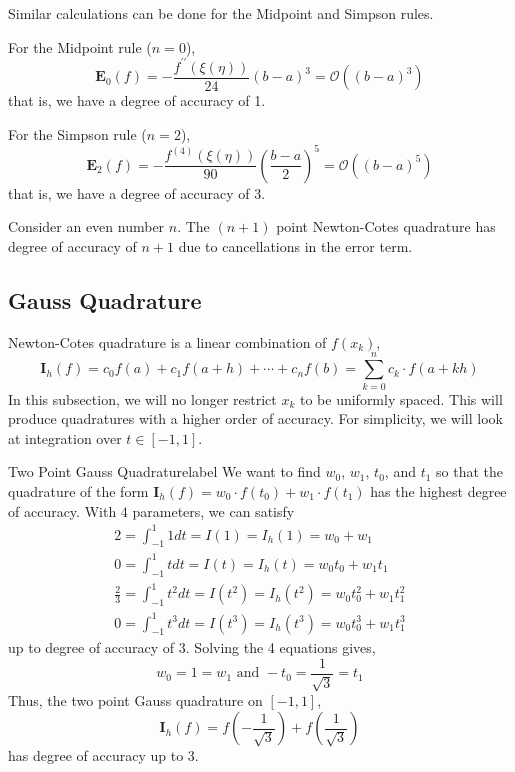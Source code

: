 \noindent Similar calculations can be done for the Midpoint and Simpson rules.

\begin{prop}
	For the Midpoint rule ($n = 0$),
	\[\mathbf{E}_0(f)=-\frac{f^{\prime \prime}(\xi(\eta))}{24}(b-a)^3=\mathcal{O}\left((b-a)^3\right)\]
	that is, we have a degree of accuracy of 1.
\end{prop}

\begin{prop}
	For the Simpson rule ($n = 2$),
	\[\mathbf{E}_2(f) = -\frac{f^{(4)}(\xi(\eta))}{90}\left(\frac{b-a}{2}\right)^5=\mathcal{O}\left((b-a)^5\right)\]
	that is, we have a degree of accuracy of 3.
\end{prop}

\begin{marginfigure}
	Consider an even number $n$. The $(n + 1)$ point Newton-Cotes quadrature has degree of accuracy of $n + 1$ due to cancellations in the error term.
\end{marginfigure}


\subsection{Gauss Quadrature}
Newton-Cotes quadrature is a linear combination of $f(x_k)$,
\[\mathbf{I}_h(f) = c_0 f(a) + c_1 f(a + h) + \cdots + c_n f(b) = \sum_{k=0}^n c_k \cdot f(a+kh)\]
In this subsection, we will no longer restrict $x_k$ to be uniformly spaced. This will produce quadratures with a higher order of accuracy. For simplicity, we will look at integration over $t \in [-1,1]$.

\NewLine 

\begin{ex}{Two Point Gauss Quadrature}{label}
	We want to find $w_0$, $w_1$, $t_0$, and $t_1$ so that the quadrature of the form $\mathbf{I}_h(f) = w_0 \cdot f(t_0) + w_1 \cdot f(t_1)$ has the highest degree of accuracy. With $4$ parameters, we can satisfy
	\[
	\begin{gathered}
	2=\int_{-1}^1 1 d t=I(1)=I_h(1)=w_0+w_1 \\
	0=\int_{-1}^1 t d t=I(t)=I_h(t)=w_0 t_0+w_1 t_1 \\
	\frac{2}{3}=\int_{-1}^1 t^2 d t=I(t^2)=I_h(t^2)=w_0 t_0^2+w_1 t_1^2 \\
	0=\int_{-1}^1 t^3 d t=I(t^3)=I_h(t^3)=w_0 t_0^3+w_1 t_1^3
	\end{gathered}
	\]
	up to degree of accuracy of $3$. Solving the 4 equations gives,
	\[w_0 = 1 = w_1 \text{ and } -t_0 = \frac{1}{\sqrt{3}} = t_1\]
	Thus, the two point Gauss quadrature on $[-1,1]$,
	\[\mathbf{I}_h(f) = f\left(-\frac{1}{\sqrt{3}}\right)+f\left(\frac{1}{\sqrt{3}}\right)\]
	has degree of accuracy up to 3.
\end{ex}

